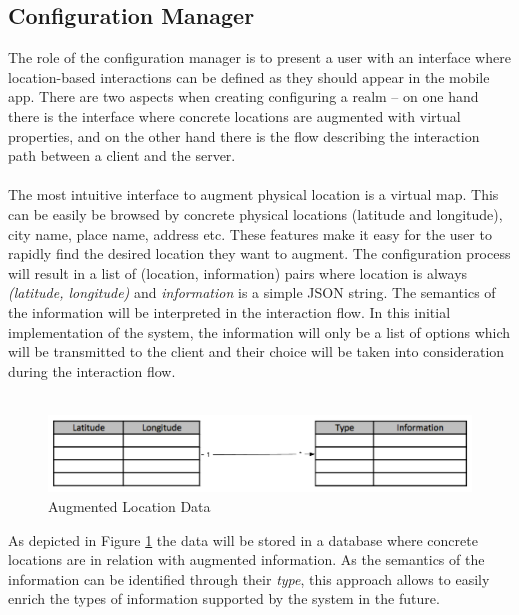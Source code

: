 \subsection{Configuration Manager} %
\label{sub:configuration_manager}
The role of the configuration manager is to present a user with an interface where location-based interactions can be defined as they should appear in the mobile app. There are two aspects when creating configuring a realm -- on one hand there is the interface where concrete locations are augmented with virtual properties, and on the other hand there is the flow describing the interaction path between a client and the server.
\\\\
The most intuitive interface to augment physical location is a virtual map. This can be easily be browsed by concrete physical locations (latitude and longitude), city name, place name, address etc. These features make it easy for the user to rapidly find the desired location they want to augment. The configuration process will result in a list of (location, information) pairs where location is always \emph{(latitude, longitude)} and \emph{information} is a simple JSON string. The semantics of the information will be interpreted in the interaction flow. In this initial implementation of the system, the information will only be a list of options which will be transmitted to the client and their choice will be taken into consideration during the interaction flow.
\\\\
\begin{figure}[H]
	\centering
	\includegraphics[width=0.9\linewidth]{fig/virtual_properties}
	\caption{Augmented Location Data}
	\label{fig.design.virtual_properties}
\end{figure}
As depicted in Figure \ref{fig.design.virtual_properties} the data will be stored in a database where concrete locations are in relation with augmented information. As the semantics of the information can be identified through their \emph{type}, this approach allows to easily enrich the types of information supported by the system in the future.
\\\\
